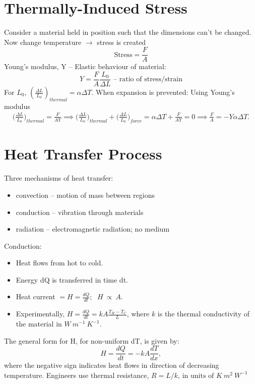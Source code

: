 \documentclass[a4paper, 11pt, normalem]{report}
\begin{document}
\section{Thermally-Induced Stress}
Consider a material held in position such that the dimensions can't be changed.
Now change temperature $\rightarrow$ stress is created
\begin{equation}
	\text{Stress} = \frac{F}{A}
\end{equation}
Young's modulus, Y -- Elastic behaviour of material:
\begin{equation}
	Y = \frac{F}{A}\frac{L_{0}}{{\Delta}L} \text{ -- ratio of stress/strain}
\end{equation}
For $L_{0}$, $(\frac{{\Delta}L}{L_{0}})_{thermal} = \alpha{\Delta}T$.
When expansion is prevented: Using Young's modulus
\begin{align}
	\bigg(\frac{{\Delta}L}{L_{0}}\bigg)_{thermal} = \frac{F}{AY} \implies \bigg(\frac{{\Delta}L}{L_{0}}\bigg)_{thermal} + \bigg(\frac{{\Delta}L}{L_{0}}\bigg)_{force} = \alpha{\Delta}T + \frac{F}{AY} = 0 \implies \frac{F}{A} = -Y\alpha{\Delta}T.
\end{align}

\section{Heat Transfer Process}
Three mechanisms of heat transfer:
\begin{itemize}
	\item convection -- motion of mass between regions
	\item conduction -- vibration through materials
	\item radiation -- electromagnetic radiation; no medium
\end{itemize}
Conduction:
\begin{itemize}
    \item Heat flows from hot to cold.
    \item Energy dQ is transferred in time dt.
    \item Heat current $= H = \frac{dQ}{dt} \text{; }~~ H~\propto~A$.
    \item Experimentally, $H = \frac{dQ}{dt} = kA\frac{T_{H}-T_{C}}{L}$, where $k$ is the thermal conductivity of the material in $W~m^{-1}~K^{-1}$.
\end{itemize}
The general form for H, for non-uniform dT, is given by:
\begin{equation}
	H = \frac{dQ}{dt} = -kA\frac{dT}{dx},
\end{equation}
where the negative sign indicates heat flows in direction of decreasing temperature.
Engineers use thermal resistance, $R = L/k \text{, in units of } K~m^{2}~W^{-1}$
\end{document}
